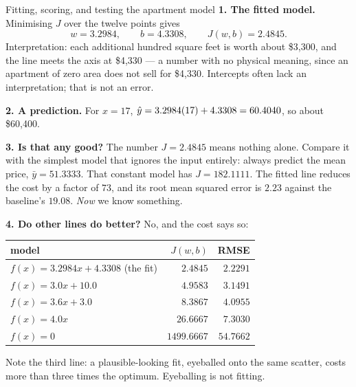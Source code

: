 \begin{workedexample}{Fitting, scoring, and testing the apartment model}
\textbf{1. The fitted model.} Minimising $J$ over the twelve points gives
\[
  w = 3.2984, \qquad b = 4.3308, \qquad J(w,b) = 2.4845 .
\]
Interpretation: each additional hundred square feet is worth about \$3{,}300,
and the line meets the axis at \$4{,}330 --- a number with no physical meaning,
since an apartment of zero area does not sell for \$4{,}330. Intercepts often
lack an interpretation; that is not an error.

\textbf{2. A prediction.} For $x = 17$,
$\hat{y} = 3.2984(17) + 4.3308 = 60.4040$, so about \$60{,}400.

\textbf{3. Is that any good?} The number $J=2.4845$ means nothing alone. Compare
it with the simplest model that ignores the input entirely: always predict the
mean price, $\bar y = 51.3333$. That constant model has $J = 182.1111$. The
fitted line reduces the cost by a factor of $73$, and its root mean squared
error is $2.23$ against the baseline's $19.08$. \emph{Now} we know something.

\textbf{4. Do other lines do better?} No, and the cost says so:
\begin{center}
\small
\begin{tabular}{@{}lrr@{}}
\toprule
model & $J(w,b)$ & RMSE\\
\midrule
$f(x)=3.2984x+4.3308$ \quad(the fit) & $2.4845$  & $2.2291$\\
$f(x)=3.0x+10.0$                     & $4.9583$  & $3.1491$\\
$f(x)=3.6x+3.0$                      & $8.3867$  & $4.0955$\\
$f(x)=4.0x$                          & $26.6667$ & $7.3030$\\
$f(x)=0$                             & $1499.6667$ & $54.7662$\\
\bottomrule
\end{tabular}
\end{center}
Note the third line: a plausible-looking fit, eyeballed onto the same scatter,
costs more than three times the optimum. Eyeballing is not fitting.


\end{workedexample}
